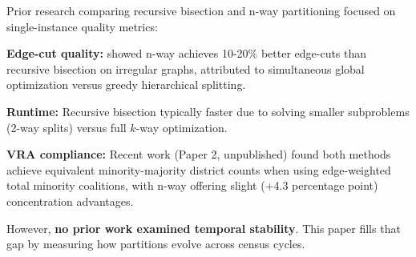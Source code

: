 Prior research comparing recursive bisection and n-way partitioning focused on single-instance quality metrics:

\textbf{Edge-cut quality:} \citet{karypis1998fast} showed n-way achieves 10-20\% better edge-cuts than recursive bisection on irregular graphs, attributed to simultaneous global optimization versus greedy hierarchical splitting.

\textbf{Runtime:} Recursive bisection typically faster due to solving smaller subproblems (2-way splits) versus full $k$-way optimization.

\textbf{VRA compliance:} Recent work (Paper 2, unpublished) found both methods achieve equivalent minority-majority district counts when using edge-weighted total minority coalitions, with n-way offering slight (+4.3 percentage point) concentration advantages.

However, \textbf{no prior work examined temporal stability}. This paper fills that gap by measuring how partitions evolve across census cycles.
